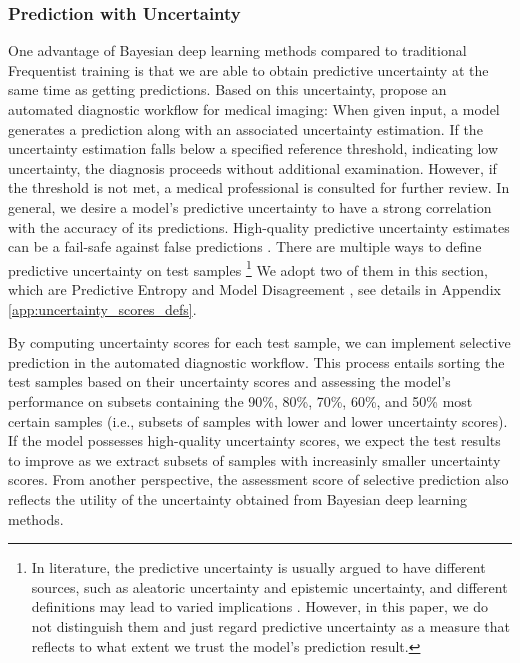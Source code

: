 \documentclass[10pt]{article} %
\begin{document}
\subsubsection{Prediction with Uncertainty}
One advantage of Bayesian deep learning methods compared to traditional Frequentist training is that we are able to obtain predictive uncertainty at the same time as getting predictions. Based on this uncertainty, \citet{band2022benchmarking} propose an automated diagnostic workflow for medical imaging: When given input, a model generates a prediction along with an associated uncertainty estimation. If the uncertainty estimation falls below a specified reference threshold, indicating low uncertainty, the diagnosis proceeds without additional examination. However, if the threshold is not met, a medical professional is consulted for further review. In general, we desire a model's predictive uncertainty to have a strong correlation with the accuracy of its predictions. High-quality predictive uncertainty estimates can be a fail-safe against false predictions \citep{band2022benchmarking}. There are multiple ways to define predictive uncertainty on test samples \footnote{In literature, the predictive uncertainty is usually argued to have different sources, such as aleatoric uncertainty and epistemic uncertainty, and different definitions may lead to varied implications \citep{ulmer2023prior, d2021repulsive}. However, in this paper, we do not distinguish them and just regard predictive uncertainty as a measure that reflects to what extent we trust the model's prediction result.} We adopt two of them in this section, which are Predictive Entropy \citep{band2022benchmarking} and Model Disagreement \citep{d2021repulsive}, see details in Appendix \ref{app:uncertainty_scores_defs}. 

By computing uncertainty scores for each test sample, we can implement selective prediction in the automated diagnostic workflow. This process entails sorting the test samples based on their uncertainty scores and assessing the model's performance on subsets containing the 90\%, 80\%, 70\%, 60\%, and 50\% most certain samples (i.e., subsets of samples with lower and lower uncertainty scores). If the model possesses high-quality uncertainty scores, we expect the test results to improve as we extract subsets of samples with increasinly smaller uncertainty scores. From another perspective, the assessment score of selective prediction also reflects the utility of the uncertainty obtained from Bayesian deep learning methods.
\end{document}
